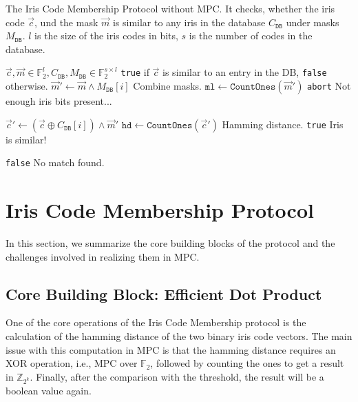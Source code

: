 \documentclass[a4paper,11pt,
]{article}
\newcommand{\F}{\ensuremath{\mathbb{F}}\xspace}
\newcommand{\Z}{\ensuremath{\mathbb{Z}}\xspace}
\begin{document}
\begin{algorithm}[ht]
    \caption{The Iris Code Membership Protocol without MPC. It checks, whether the iris code $\vec{c}$, und the mask $\vec{m}$ is similar to any iris in the database $C_\texttt{DB}$ under masks $M_\texttt{DB}$. $l$ is the size of the iris codes in bits, $s$ is the number of codes in the database. \label{alg:iris_plain}}
    \begin{algorithmic}[l]
        \Require $\vec{c}, \vec{m} \in \F_2^l, C_\texttt{DB}, M_\texttt{DB} \in \F_2^{s \times l}$
        \Ensure \texttt{true} if $\vec{c}$ is similar to an entry in the DB, \texttt{false} otherwise.
        \State $\vec{m}' \gets \vec{m} \wedge M_\texttt{DB}[i]$
        \Comment Combine masks.
        \State $\texttt{ml} \gets \texttt{CountOnes}(\vec{m}')$
        \State \Return \texttt{abort} \Comment Not enough iris bits present...
        \EndIf

        \State $\vec{c}' \gets (\vec{c} \oplus C_\texttt{DB}[i]) \wedge \vec{m}'$
        \State $\texttt{hd} \gets \texttt{CountOnes}(\vec{c}')$
        \Comment Hamming distance.
        \State \Return \texttt{true}
        \Comment Iris is similar!
        \EndIf
        \EndFor

        \State \Return \texttt{false}
        \Comment No match found.
    \end{algorithmic}
\end{algorithm}

\section{Iris Code Membership Protocol}

In this section, we summarize the core building blocks of the protocol and the challenges involved in realizing them in MPC.

\subsection{Core Building Block: Efficient Dot Product}

One of the core operations of the Iris Code Membership protocol is the calculation of the hamming distance of the two binary iris code vectors. The main issue with this computation in MPC is that the hamming distance requires an XOR operation, i.e., MPC over $\F_2$, followed by counting the ones to get a result in $\Z_{2^k}$. Finally, after the comparison with the threshold, the result will be a boolean value again.
\end{document}
